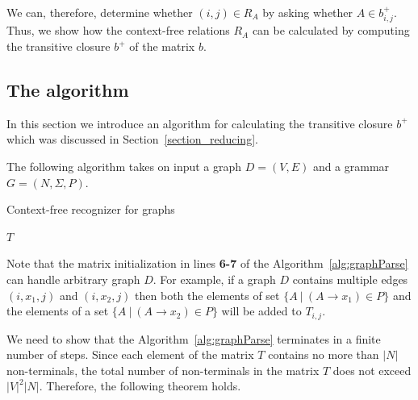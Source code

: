 We can, therefore, determine whether $(i,j) \in R_A$ by asking whether $A \in b^+_{i,j}$. Thus, we show how the context-free relations $R_A$ can be calculated by computing the transitive closure $b^+$ of the matrix $b$.



\subsection{The algorithm} \label{section_algorithm}
In this section we introduce an algorithm for calculating the transitive closure $b^+$ which was discussed in Section~\ref{section_reducing}.

The following algorithm takes on input a graph $D = (V, E)$ and a grammar $G = (N,\Sigma,P)$.

\begin{algorithm}[H]
\begin{algorithmic}[1]
\caption{Context-free recognizer for graphs}
\label{alg:graphParse}
    
    \EndFor    
       
    \EndWhile
\State \Return $T$
\EndFunction
\end{algorithmic}
\end{algorithm}

Note that the matrix initialization in lines \textbf{6-7} of the Algorithm~\ref{alg:graphParse} can handle arbitrary graph $D$. For example, if a graph $D$ contains multiple edges $(i,x_1,j)$ and $(i,x_2,j)$ then both the elements of set $\{A~|~(A \rightarrow x_1) \in P \}$ and the elements of a set $\{A~|~(A \rightarrow x_2) \in P \}$ will be added to $T_{i,j}$.

We need to show that the Algorithm~\ref{alg:graphParse} terminates in a finite number of steps. Since each element of the matrix $T$ contains no more than $|N|$ non-terminals, the total number of non-terminals in the matrix $T$ does not exceed $|V|^2|N|$. Therefore, the following theorem holds.

